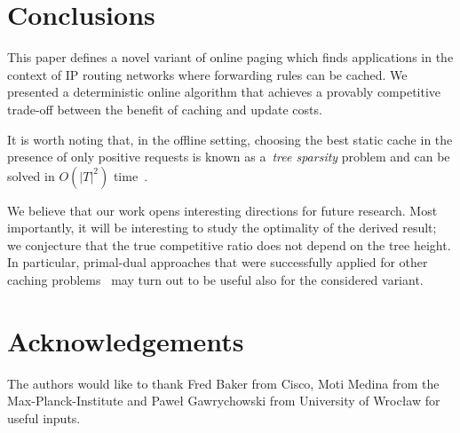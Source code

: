 \documentclass[sigconf,screen=true]{acmart}
\begin{document}


\section{Conclusions}\label{sec:conclusion}

This paper defines a novel variant of online paging which finds
applications in the context of IP routing networks where forwarding rules can
be cached. We presented a deterministic online algorithm that achieves a
provably competitive trade-off between the benefit of caching and update costs.

It is worth noting that, in the offline setting, choosing the best static cache 
in the presence of only positive requests is known as a~\emph{tree sparsity}
problem and can be solved in $O(|T|^2)$ time~\cite{tree-sparsity}.

We believe that our work opens interesting directions for future research.
Most importantly, it will be interesting to study the optimality of the
derived result; we conjecture that the true competitive ratio does not 
depend on the tree height. In particular, primal-dual approaches that were
successfully applied for other caching
problems~\cite{young-paging-greedy-dual,generalized-caching-optimal,generalized-caching-bansal} may turn out to be useful also for the considered variant. 




\section*{Acknowledgements}

The authors would like to thank Fred Baker from
Cisco, Moti Medina from the Max-Planck-Institute and Paweł
Gawrychowski from University of Wrocław for useful inputs.



  

\appendix
\end{document}

